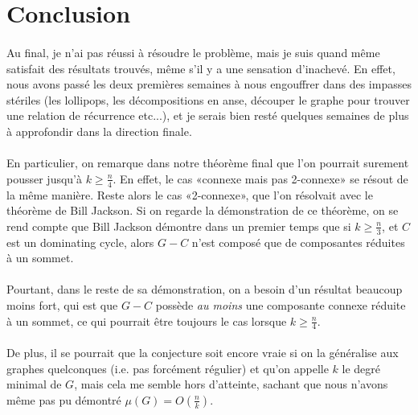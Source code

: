\documentclass[a4paper]{article}
\theoremstyle{definition}
\theoremstyle{remark}
\begin{document}
\newpage
\section{Conclusion}
\paragraph{}
Au final, je n'ai pas réussi à résoudre le problème, mais je suis quand même satisfait des résultats trouvés, même s'il y a une sensation 
d'inachevé. En effet, nous avons passé les deux premières semaines à 
nous engouffrer dans des impasses stériles (les lollipops, les 
décompositions en anse, découper le graphe pour trouver une relation de récurrence etc...), et je serais bien resté quelques semaines de plus à 
approfondir dans la direction finale.


\paragraph{}
En particulier, on remarque dans notre théorème final que l'on pourrait 
surement pousser jusqu'à $k \geq \frac{n}{4}$. En effet, le cas
 «connexe mais pas 2-connexe» se résout de la même manière. Reste alors 
le cas «2-connexe», que l'on résolvait avec le théorème de Bill Jackson.
Si on regarde la démonstration de ce théorème, on se rend compte que 
Bill Jackson démontre dans un premier temps que si $k \geq \frac{n}{3}$, et $C$ est un dominating cycle, alors $G-C$ n'est composé que de composantes réduites à un sommet. 

\paragraph{}
Pourtant, dans le reste de sa démonstration, on a besoin d'un résultat beaucoup moins fort, qui est
que $G-C$ possède \emph{au moins} une composante connexe réduite à un sommet, ce
qui pourrait être toujours le cas lorsque $k \geq \frac{n}{4}$.

\paragraph{}
De plus, il se pourrait que la conjecture soit encore vraie si on la 
généralise aux graphes quelconques (i.e. pas forcément régulier) et 
qu'on appelle $k$ le degré minimal de $G$, mais cela me semble hors 
d'atteinte, sachant que nous n'avons même pas pu démontré $\mu(G)=O(\frac{n}{k})$.


\newpage
\end{document}
